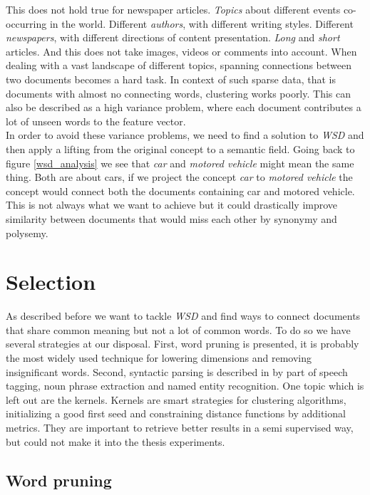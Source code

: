   This does not hold true for newspaper articles. \emph{Topics} about different events co-occurring in the world. Different \emph{authors}, with different writing styles. Different \emph{newspapers}, with different directions of content presentation. \emph{Long} and \emph{short} articles. And this does not take images, videos or comments into account. When dealing with a vast landscape of different topics, spanning connections between two documents becomes a hard task. In context of such sparse data, that is documents with almost no connecting words, clustering works poorly. This can also be described as a high variance problem, where each document contributes a lot of unseen words to the feature vector.\\

  In order to avoid these variance problems, we need to find a solution to \emph{WSD} and then apply a lifting from the original concept to a semantic field. Going back to figure \ref{wsd_analysis} we see that \emph{car} and \emph{motored vehicle} might mean the same thing. Both are about cars, if we project the concept \emph{car} to \emph{motored vehicle} the concept would connect both the documents containing car and motored vehicle. This is not always what we want to achieve but it could drastically improve similarity between documents that would miss each other by synonymy and polysemy.

\section{Selection}
\label{sec:selection}

  As described before we want to tackle \emph{WSD} and find ways to connect documents that share common meaning but not a lot of common words. To do so we have several strategies at our disposal. First, word pruning is presented, it is probably the most widely used technique for lowering dimensions and removing insignificant words. Second, syntactic parsing is described in by part of speech tagging, noun phrase extraction and named entity recognition. One topic which is left out are the kernels. Kernels are smart strategies for clustering algorithms, initializing a good first seed and constraining distance functions by additional metrics. They are important to retrieve better results in a semi supervised way, but could not make it into the thesis experiments.

  \subsection{Word pruning}
  \label{sec:word_pruning}

